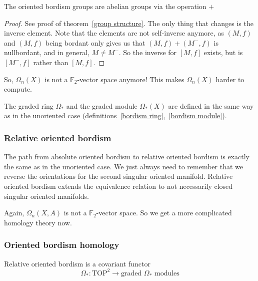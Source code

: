 \documentclass[a4paper,11pt]{article}
\begin{document}
\begin{theorem}
    The oriented bordism groups are abelian groups via the operation \(+\)
\end{theorem}

\begin{proof}
    See proof of theorem\ \ref{group structure}. The only thing that changes is the inverse element. Note that the elements are not self-inverse anymore, as \((M,f)\) and \((M,f)\) being bordant only gives us that \((M,f)+(M^-,f)\) is nullbordant, and in general, \(M\neq M^-\). So the inverse for \([M,f]\) exists, but is \([M^-,f]\) rather than \([M,f]\).
\end{proof}

So, \(\Omega_n(X)\) is not a \(\mathbb{F}_2\)-vector space anymore! This makes \(\Omega_n(X)\) harder to compute.

The graded ring \(\Omega_\ast\) and the graded module \(\Omega_\ast(X)\) are defined in the same way as in the unoriented case (definitions\ \ref{bordism ring},\ \ref{bordism module}).


\subsubsection{Relative oriented bordism}

The path from absolute oriented bordism to relative oriented bordism is exactly the same as in the unoriented case. We just always need to remember that we reverse the orientations for the second singular oriented manifold. Relative oriented bordism extends the equivalence relation to not necessarily closed singular oriented manifolds.

Again, \(\Omega_n(X,A)\) is not a \(\mathbb{F}_2\)-vector space. So we get a more complicated homology theory now.

\subsubsection{Oriented bordism homology}

\begin{lemma}
    Relative oriented bordism is a covariant functor
    \[\Omega_\ast:\mathrm{TOP}^2\to\text{graded }\Omega_\ast\text{ modules}\]
\end{lemma}
\end{document}
